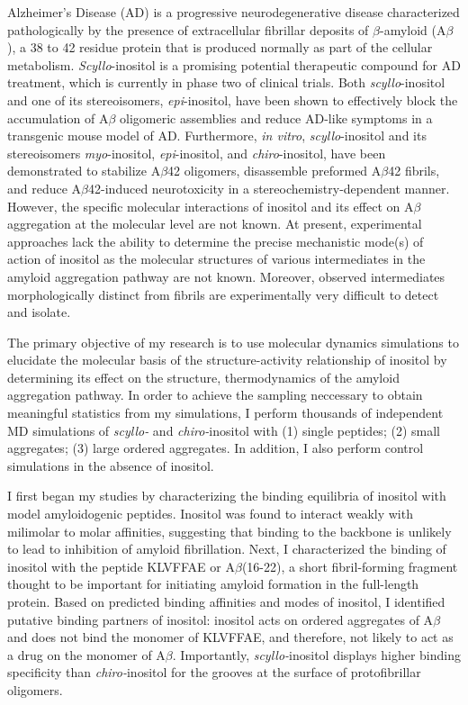 
Alzheimer's Disease (AD) is a progressive neurodegenerative disease characterized pathologically by the presence of extracellular fibrillar deposits of $\beta$-amyloid (A$\beta$), a 38 to 42 residue protein that is produced normally as part of the cellular metabolism. \emph{Scyllo}-inositol is a promising potential therapeutic compound for AD treatment, which is currently in phase two of clinical trials. Both \emph{scyllo}-inositol and one of its stereoisomers, \emph{epi}-inositol, have been shown to effectively block the accumulation of A$\beta$ oligomeric assemblies and reduce AD-like symptoms in a transgenic mouse model of AD. Furthermore, \emph{in vitro}, \emph{scyllo}-inositol and its stereoisomers \emph{myo}-inositol, \emph{epi}-inositol, and \emph{chiro}-inositol, have been demonstrated to stabilize A$\beta$42 oligomers, disassemble preformed A$\beta$42 fibrils, and reduce A$\beta$42-induced neurotoxicity in a stereochemistry-dependent manner. However, the specific molecular interactions of inositol and its effect on A$\beta$ aggregation at the molecular level are not known. At present, experimental approaches lack the ability to determine the precise mechanistic mode(s) of action of inositol as the molecular structures of various intermediates in the amyloid aggregation pathway are not known. Moreover, observed intermediates morphologically distinct from fibrils are experimentally very difficult to detect and isolate.

The primary objective of my research is to use molecular dynamics simulations to elucidate the molecular basis of the structure-activity relationship of inositol by determining its effect on the structure, thermodynamics of the amyloid aggregation pathway.  In order to achieve the sampling neccessary to obtain meaningful statistics from my simulations, I perform thousands of independent MD simulations of \textit{scyllo-} and \textit{chiro-}inositol with (1) single peptides; (2) small aggregates; (3) large ordered aggregates. In addition, I also perform control simulations in the absence of inositol. 

I first began my studies by characterizing the binding equilibria of inositol with model amyloidogenic peptides.  Inositol was found to interact weakly with milimolar to molar affinities, suggesting that binding to the backbone is unlikely to lead to inhibition of amyloid fibrillation. Next, I characterized the binding of inositol with the peptide KLVFFAE or A$\beta$(16-22), a short fibril-forming fragment thought to be important for initiating amyloid formation in the full-length protein.  Based on predicted binding affinities and modes of inositol, I identified putative binding partners of inositol:  inositol acts on ordered aggregates of A$\beta$ and does not bind the monomer of KLVFFAE, and therefore, not likely to act as a drug on the monomer of A$\beta$. Importantly, \textit{scyllo-}inositol displays higher binding specificity than \textit{chiro-}inositol for the grooves at the surface of protofibrillar oligomers. 

